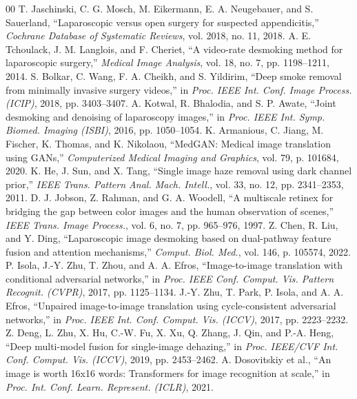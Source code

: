 \documentclass[conference]{IEEEtran}
\begin{document}

\begin{thebibliography}{00}
 T. Jaschinski, C. G. Mosch, M. Eikermann, E. A. Neugebauer, and S. Sauerland, ``Laparoscopic versus open surgery for suspected appendicitis,'' \textit{Cochrane Database of Systematic Reviews}, vol. 2018, no. 11, 2018.
 A. E. Tchoulack, J. M. Langlois, and F. Cheriet, ``A video-rate desmoking method for laparoscopic surgery,'' \textit{Medical Image Analysis}, vol. 18, no. 7, pp. 1198--1211, 2014.
 S. Bolkar, C. Wang, F. A. Cheikh, and S. Yildirim, ``Deep smoke removal from minimally invasive surgery videos,'' in \textit{Proc. IEEE Int. Conf. Image Process. (ICIP)}, 2018, pp. 3403--3407.
 A. Kotwal, R. Bhalodia, and S. P. Awate, ``Joint desmoking and denoising of laparoscopy images,'' in \textit{Proc. IEEE Int. Symp. Biomed. Imaging (ISBI)}, 2016, pp. 1050--1054.
 K. Armanious, C. Jiang, M. Fischer, K. Thomas, and K. Nikolaou, ``MedGAN: Medical image translation using GANs,'' \textit{Computerized Medical Imaging and Graphics}, vol. 79, p. 101684, 2020.
 K. He, J. Sun, and X. Tang, ``Single image haze removal using dark channel prior,'' \textit{IEEE Trans. Pattern Anal. Mach. Intell.}, vol. 33, no. 12, pp. 2341--2353, 2011.
 D. J. Jobson, Z. Rahman, and G. A. Woodell, ``A multiscale retinex for bridging the gap between color images and the human observation of scenes,'' \textit{IEEE Trans. Image Process.}, vol. 6, no. 7, pp. 965--976, 1997.
 Z. Chen, R. Liu, and Y. Ding, ``Laparoscopic image desmoking based on dual-pathway feature fusion and attention mechanisms,'' \textit{Comput. Biol. Med.}, vol. 146, p. 105574, 2022.
 P. Isola, J.-Y. Zhu, T. Zhou, and A. A. Efros, ``Image-to-image translation with conditional adversarial networks,'' in \textit{Proc. IEEE Conf. Comput. Vis. Pattern Recognit. (CVPR)}, 2017, pp. 1125--1134.
 J.-Y. Zhu, T. Park, P. Isola, and A. A. Efros, ``Unpaired image-to-image translation using cycle-consistent adversarial networks,'' in \textit{Proc. IEEE Int. Conf. Comput. Vis. (ICCV)}, 2017, pp. 2223--2232.
 Z. Deng, L. Zhu, X. Hu, C.-W. Fu, X. Xu, Q. Zhang, J. Qin, and P.-A. Heng, ``Deep multi-model fusion for single-image dehazing,'' in \textit{Proc. IEEE/CVF Int. Conf. Comput. Vis. (ICCV)}, 2019, pp. 2453--2462.
 A. Dosovitskiy et al., ``An image is worth 16x16 words: Transformers for image recognition at scale,'' in \textit{Proc. Int. Conf. Learn. Represent. (ICLR)}, 2021.

\end{thebibliography}
\end{document}
